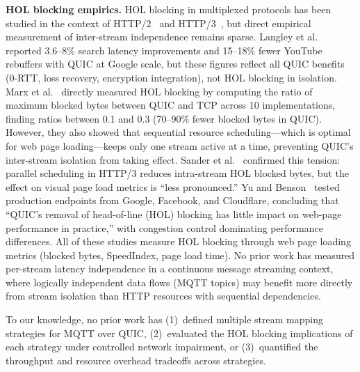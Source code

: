 \textbf{HOL blocking empirics.} HOL blocking in multiplexed protocols has been studied in the context of HTTP/2~\cite{rfc7540} and HTTP/3~\cite{rfc9114}, but direct empirical measurement of inter-stream independence remains sparse. Langley et al.~\cite{langley2017quic} reported 3.6--8\% search latency improvements and 15--18\% fewer YouTube rebuffers with QUIC at Google scale, but these figures reflect all QUIC benefits (0-RTT, loss recovery, encryption integration), not HOL blocking in isolation. Marx et al.~\cite{marx2020multiplexing} directly measured HOL blocking by computing the ratio of maximum blocked bytes between QUIC and TCP across 10 implementations, finding ratios between 0.1 and 0.3 (70--90\% fewer blocked bytes in QUIC). However, they also showed that sequential resource scheduling---which is optimal for web page loading---keeps only one stream active at a time, preventing QUIC's inter-stream isolation from taking effect. Sander et al.~\cite{sander2022hol} confirmed this tension: parallel scheduling in HTTP/3 reduces intra-stream HOL blocked bytes, but the effect on visual page load metrics is ``less pronounced.'' Yu and Benson~\cite{yu2021quic} tested production endpoints from Google, Facebook, and Cloudflare, concluding that ``QUIC's removal of head-of-line (HOL) blocking has little impact on web-page performance in practice,'' with congestion control dominating performance differences. All of these studies measure HOL blocking through web page loading metrics (blocked bytes, SpeedIndex, page load time). No prior work has measured per-stream latency independence in a continuous message streaming context, where logically independent data flows (MQTT topics) may benefit more directly from stream isolation than HTTP resources with sequential dependencies.

To our knowledge, no prior work has (1)~defined multiple stream mapping strategies for MQTT over QUIC, (2)~evaluated the HOL blocking implications of each strategy under controlled network impairment, or (3)~quantified the throughput and resource overhead tradeoffs across strategies.
